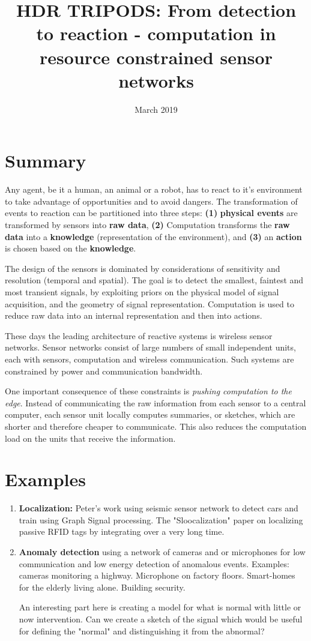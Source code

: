 \documentclass{article}
\title{HDR TRIPODS: From detection to reaction - computation in resource constrained sensor networks}
\date{March 2019}
\begin{document}
\maketitle

\section{Summary}
Any agent, be it a human, an animal or a robot, has to react to it's environment to take advantage of opportunities and to avoid dangers. The transformation of events to reaction can be partitioned into three steps: {\bf(1)} {\bf physical events} are transformed by sensors into {\bf raw data}, {\bf (2)} Computation transforms the {\bf raw data} into a {\bf knowledge} (representation of the environment), and {\bf (3)} an {\bf action} is chosen based on the {\bf knowledge}.

The design of the sensors is dominated by considerations of sensitivity and resolution (temporal and spatial).  The goal is to detect the smallest, faintest and most transient signals,
by exploiting priors on the physical model of signal acquisition, and the geometry of signal representation. Computation is used to reduce raw data into an internal representation and then into actions. 

These days the leading architecture of reactive systems is wireless sensor networks. Sensor networks consist of large numbers of small independent units, each with sensors, computation and wireless communication. Such systems are constrained by power and communication bandwidth. 

One important consequence of these constraints is {\em pushing computation to the edge}. Instead of communicating the raw information from each sensor to a central computer, each sensor unit locally computes summaries, or sketches, which are shorter and therefore cheaper to communicate. This also reduces the computation load on the units that receive the information.

\section{Examples}
\begin{enumerate}
    \item {\bf Localization:} Peter's work using seismic sensor network to detect cars and train using Graph Signal processing\cite{riahi2017}. The "Sloocalization" paper on localizing passive RFID tags by integrating over a very long time.
    \item {\bf Anomaly detection} using a network of cameras and or microphones for low communication and low energy detection of anomalous events. Examples: cameras monitoring a highway. Microphone on factory floors. Smart-homes for the elderly living alone. Building security.
    
    An interesting part here is creating a model for what is normal with little or now intervention. Can we create a sketch of the signal which would be useful for defining the "normal" and distinguishing it from the abnormal?
\end{enumerate}
\end{document}
